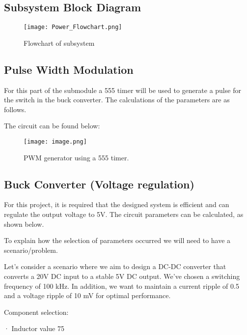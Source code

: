 \documentclass[class=report,11pt,crop=false]{standalone}
\begin{document}
\subsection{Subsystem Block Diagram}

 \begin{figure}
     \centering
     \texttt{[image: Power\_Flowchart.png]}
     \caption{Flowchart of subsystem}
     \label{fig:enter-label}
 \end{figure}

\subsection{Pulse Width Modulation}

For this part of the submodule a 555 timer will be used to generate a pulse for the switch in the buck converter. The calculations of the parameters are as follows.

The circuit can be found below:
\begin{figure}
    \centering
    \texttt{[image: image.png]}
    \caption{PWM generator using a 555 timer.}
    \label{fig:enter-label}
\end{figure}


\subsection{Buck Converter (Voltage regulation)}

For this project, it is required that the designed system is efficient and can regulate the output voltage to 5V. The circuit parameters can be calculated, as shown below.

To explain how the selection of parameters occurred we will need to have a scenario/problem. 

Let's consider a scenario where we aim to design a DC-DC converter that converts a 20V DC input to a stable 5V DC output. We've chosen a switching frequency of 100 kHz. In addition, we want to maintain a current ripple of 0.5 and a voltage ripple of 10 mV for optimal performance.

 

 

 

 

 

 

 Component selection:

· Inductor value 75 
\end{document}
